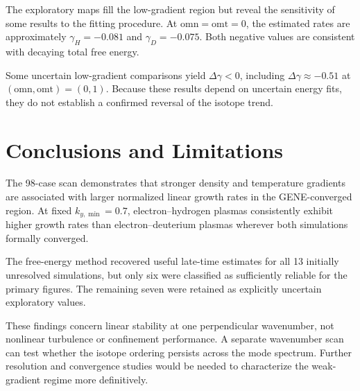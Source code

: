 \documentclass[10pt,letterpaper]{article}
\begin{document}
The exploratory maps fill the low-gradient
region but reveal the sensitivity of some
results to the fitting procedure.
At $\mathrm{omn}=\mathrm{omt}=0$,
the estimated rates are approximately
$\gamma_H=-0.081$ and $\gamma_D=-0.075$.
Both negative values are consistent with
decaying total free energy.

Some uncertain low-gradient comparisons yield
$\Delta\gamma<0$, including
$\Delta\gamma\approx-0.51$ at
$(\mathrm{omn},\mathrm{omt})=(0,1)$.
Because these results depend on uncertain
energy fits, they do not establish a confirmed
reversal of the isotope trend.

\section{Conclusions and Limitations}

The 98-case scan demonstrates that stronger
density and temperature gradients are associated
with larger normalized linear growth rates in
the GENE-converged region. At fixed
$k_{y,\min}=0.7$, electron--hydrogen plasmas
consistently exhibit higher growth rates than
electron--deuterium plasmas wherever both
simulations formally converged.

The free-energy method recovered useful
late-time estimates for all 13 initially
unresolved simulations, but only six were
classified as sufficiently reliable for
the primary figures. The remaining seven
were retained as explicitly uncertain
exploratory values.

These findings concern linear stability at
one perpendicular wavenumber, not nonlinear
turbulence or confinement performance.
A separate wavenumber scan can test whether
the isotope ordering persists across the
mode spectrum. Further resolution and
convergence studies would be needed to
characterize the weak-gradient regime
more definitively.
\end{document}

